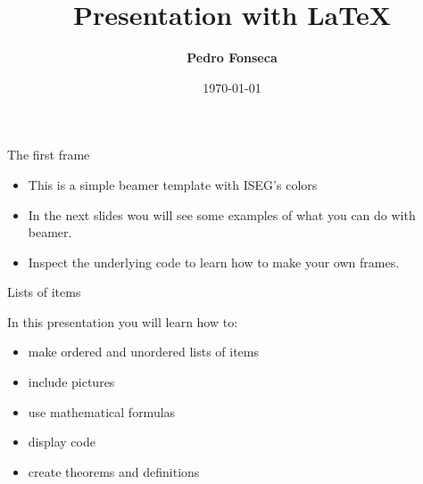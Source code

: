 


\title[Presentation with LaTeX]{Presentation with \LaTeX}

\author[Pedro Fonseca]{\textbf {Pedro Fonseca}}

\date{\today}







\begin{frame}{The first frame}

\begin{itemize}

\item This is a simple beamer template with ISEG's colors

\item In the next slides wou will see some examples of what you can do with beamer.

\item Inspect the underlying code to learn how to make your own frames.

\end{itemize}

\end{frame}


\begin{frame}{Lists of items}

In this presentation you will learn how to:

\begin{itemize}

\item make ordered and unordered lists of items
\item include pictures
\item use mathematical formulas
\item display code
\item create theorems and definitions

\end{itemize}

\end{frame}

